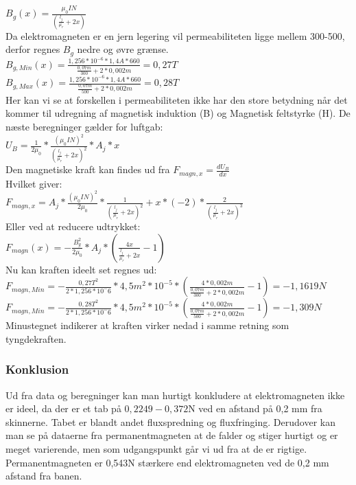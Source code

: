 $B_{g}(x)=\frac{\mu_{0}IN}{({\frac{l_{j}}{\mu_{r}}}+2x)}$\\

Da elektromagneten er en jern legering vil permeabiliteten ligge mellem 300-500, derfor regnes $B_{g}$ nedre og øvre grænse.\\

$B_{g,Min}(x)=\frac{1,256*10^{-6}*1,4A*660}{\frac{0,07m}{300}+2*0,002m}=0,27 T$\\

$B_{g,Max}(x)=\frac{1,256*10^{-6}*1,4A*660}{\frac{0,07m}{500}+2*0,002m}=0,28 T$\\

Her kan vi se at forskellen i permeabiliteten ikke har den store betydning når det kommer til udregning af magnetisk induktion (B) og Magnetisk feltstyrke (H). 
De næste beregninger gælder for luftgab:\\

$U_{B}=\frac{1}{2\mu_{0}}*\frac{(\mu_{0}IN)^{2}}{({\frac{l_{j}}{\mu_{r}}}+2x)^{2}}*A_{j}*x$ \\

Den magnetiske kraft kan findes ud fra $F_{magn,x}=\frac{dU_{B}}{dx}$ \\
Hvilket giver:\\
$F_{magn,x}=A_{j}*\frac{(\mu_{0}IN)^{2}}{2\mu_{0}}*\frac{1}{(\frac{l_{j}}{\mu_{r}}+2x)^{2}}+x*(-2)*\frac{2}{(\frac{l_{j}}{\mu_{r}}+2x)^{3}}$\\

Eller ved at reducere udtrykket:\\
$F_{magn}(x)=-{\frac{B^{2}_{g}}{2\mu_{0}}}* {A_{j}}* (\frac{4x}{{\frac{l_{j}}{\mu_{r}}}+2x}-1) $\\

Nu kan kraften ideelt set regnes ud:\\
$ F_{magn,Min}=-\frac{0,27T^{2}}{2*1,256*10^-6}*4,5m^2*10^{-5}*(\frac{4*0,002m}{\frac{0,07m}{300}+2*0,002m}-1)=-1,1619N $\\

$ F_{magn,Min}=-\frac{0,28T^{2}}{2*1,256*10^-6}*4,5m^2*10^{-5}*(\frac{4*0,002m}{\frac{0,07m}{500}+2*0,002m}-1)=-1,309N $\\

Minustegnet indikerer at kraften virker nedad i samme retning som tyngdekraften.\\

\subsubsection*{Konklusion}
Ud fra data og beregninger kan man hurtigt konkludere at elektromagneten ikke er ideel, da der er et tab på $0,2249-0,372$N ved en afstand på 0,2 mm fra skinnerne. Tabet er blandt andet fluxspredning og fluxfringing. Derudover kan man se på dataerne fra permanentmagneten at de falder og stiger hurtigt og er meget varierende, men som udgangspunkt går vi ud fra at de er rigtige. Permanentmagneten er 0,543N stærkere end elektromagneten ved de 0,2 mm afstand fra banen.  


